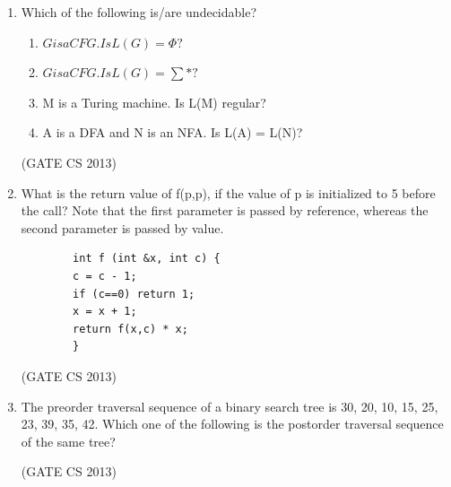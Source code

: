 \documentclass[a4paper, 11pt]{article}
\begin{document}
\begin{enumerate}
     \item Which of the following is/are undecidable? 
     \begin{enumerate}
         \item $G is a CFG. Is L(G) = \Phi?  $
         \item $G is a CFG. Is L(G) = \sum*?$
         \item M is a Turing machine. Is L(M) regular? 
         \item A is a DFA and N is an NFA. Is L(A) = L(N)? 
     \end{enumerate}
     \begin{enumerate}
     \end{enumerate}
     \hfill (GATE CS 2013)

     \item What is the return value of f(p,p), if the value of p is initialized to 5 before the call? Note that the first parameter is passed by reference, whereas the second parameter is passed by value. 
     \begin{lstlisting}
        int f (int &x, int c) {
        c = c - 1;
        if (c==0) return 1;
        x = x + 1;
        return f(x,c) * x;
        }

     \end{lstlisting}
     \begin{enumerate}
     \end{enumerate}
     \hfill (GATE CS 2013)

     \item The preorder traversal sequence of a binary search tree is 30, 20, 10, 15, 25, 23, 39, 35, 42. Which one of the following is the postorder traversal sequence of the same tree? 
     \begin{enumerate}
     \end{enumerate}
     \hfill (GATE CS 2013)


\end{enumerate}
\end{document}
